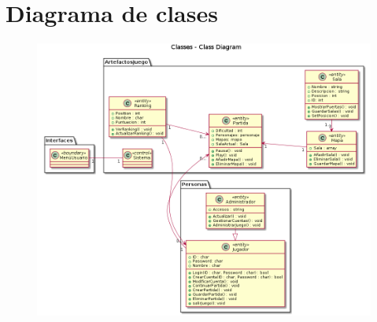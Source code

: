 \section{Diagrama de clases}\label{sec:uc}




  \begin{figure}[ht]
  \centering
  \includegraphics[width=1\textwidth]{./imatges/Diagrama Clases - v2.png}
  \label{fig:usecase}
   \end{figure}
   